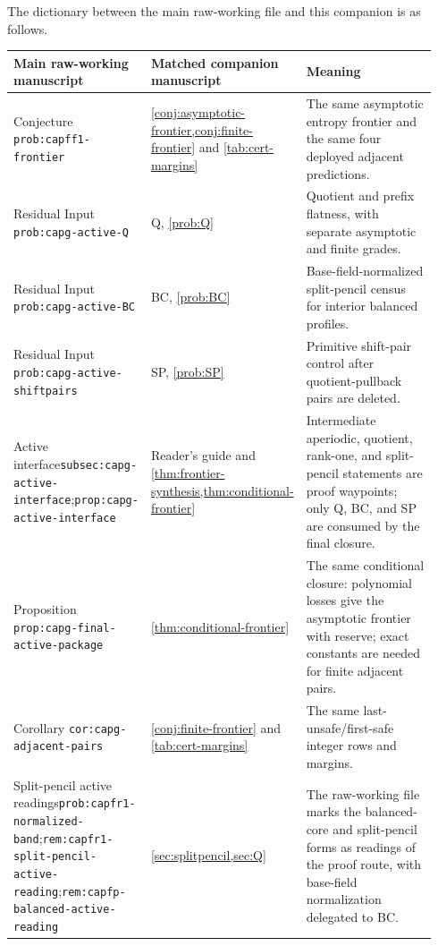 \documentclass[11pt]{article}
\theoremstyle{definition}
\theoremstyle{remark}
\begin{document}
The dictionary between the main raw-working file and this companion is as follows.
\begin{center}\scriptsize
\begin{tabular}{@{}>{\raggedright\arraybackslash}p{0.30\linewidth}>{\raggedright\arraybackslash}p{0.24\linewidth}>{\raggedright\arraybackslash}p{0.40\linewidth}@{}}
\toprule
Main raw-working manuscript & Matched companion manuscript & Meaning \\
\midrule
Conjecture \texttt{prob:capff1-frontier} & \cref{conj:asymptotic-frontier,conj:finite-frontier} and \cref{tab:cert-margins} & The same asymptotic entropy frontier and the same four deployed adjacent predictions. \\
Residual Input \texttt{prob:capg-active-Q} & Q, \cref{prob:Q} & Quotient and prefix flatness, with separate asymptotic and finite grades. \\
Residual Input \texttt{prob:capg-active-BC} & BC, \cref{prob:BC} & Base-field-normalized split-pencil census for interior balanced profiles. \\
Residual Input \texttt{prob:capg-active-shiftpairs} & SP, \cref{prob:SP} & Primitive shift-pair control after quotient-pullback pairs are deleted. \\
Active interface\newline\texttt{subsec:capg-active-}\newline\texttt{interface};\newline\texttt{prop:capg-active-}\newline\texttt{interface} & Reader's guide and \cref{thm:frontier-synthesis,thm:conditional-frontier} & Intermediate aperiodic, quotient, rank-one, and split-pencil statements are proof waypoints; only Q, BC, and SP are consumed by the final closure. \\
Proposition \texttt{prop:capg-final-active-}\newline\texttt{package} & \cref{thm:conditional-frontier} & The same conditional closure: polynomial losses give the asymptotic frontier with reserve; exact constants are needed for finite adjacent pairs. \\
Corollary \texttt{cor:capg-adjacent-pairs} & \cref{conj:finite-frontier} and \cref{tab:cert-margins} & The same last-unsafe/first-safe integer rows and margins. \\
Split-pencil active readings\newline\texttt{prob:capfr1-}\newline\texttt{normalized-band};\newline\texttt{rem:capfr1-split-}\newline\texttt{pencil-active-reading};\newline\texttt{rem:capfp-balanced-}\newline\texttt{active-reading} & \cref{sec:splitpencil,sec:Q} & The raw-working file marks the balanced-core and split-pencil forms as readings of the proof route, with base-field normalization delegated to BC. \\

\end{tabular}
\end{center}
\end{document}
